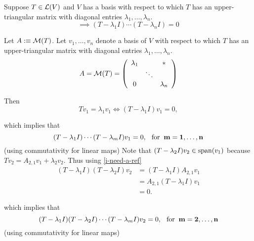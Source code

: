 \begin{thm}
  \label{thm:equation-satisfied-by-operator-with-upper-triangular-matrix}
  Suppose $T\in \mathcal{L}(V)$ and $V$ has a basis with respect to which $T$ has an upper-triangular matrix with diagonal entries $\lambda_1, \dots, \lambda_n$.
  \begin{equation}
    \implies (T-\lambda_1I) \cdots (T-\lambda_nI)=0
  \end{equation}
\end{thm}
\begin{prf}
  Let $A :\equiv \mathcal{M}(T)$. Let $v_1, \ldots, v_n$ denote a basis of $V$ with respect to which $T$  has an upper-triangular matrix with diagonal entries $\lambda_1, \ldots, \lambda_n$.
  \begin{equation}
    A=\mathcal{M}(T) =
    \left( {\begin{array}{ccc}
        \lambda_1 &         &  * \\
        &  \ddots &    \\
        0     &         & \lambda_n
    \end{array} } \right)
  \end{equation}
  
  Then
  \begin{equation}
    \label{i-need-a-ref}
    T v_1 = \lambda_1 v_1 \iff (T-\lambda_1 I)  v_1 = 0,
  \end{equation}
  
  which implies that
  \begin{equation}
    (T-\lambda_1 I) \cdots (T-\lambda_m I) v_1 = 0, \;\;\, \text{for}\;\; \mathbf{m = 1, \ldots, n}
  \end{equation}
  (using commutativity for linear maps)
  \bigbreak
  Note that $(T-\lambda_2 I) v_2 \in \operatorname{span} (v_1)$ because $T v_2 = A_{2,1} v_1 + \lambda_2 v_2$. Thus using \eqref{i-need-a-ref}
  \begin{equation}
    \begin{aligned}
      \label{i-also-need-a-ref}
      (T- \lambda_1 I) (T- \lambda_2 I) v_2 
      &= (T- \lambda_1 I) A_{2,1}v_1  \\
      &= A_{2,1}(T- \lambda_1 I) v_1  \\
      &=0. 
    \end{aligned}
  \end{equation}
  
  which implies that
  \begin{equation}
    (T-\lambda_1 I) (T-\lambda_2 I) \cdots (T-\lambda_m I) v_2 = 0, \;\;\, \text{for}\;\; \mathbf{m = 2, \ldots, n}
  \end{equation}
  (using commutativity for linear maps)
  \bigbreak
  

\end{prf}
